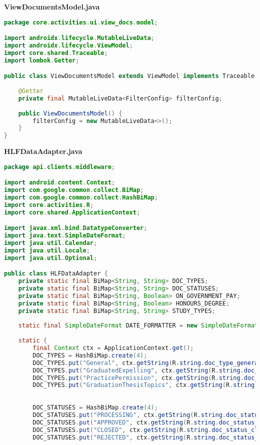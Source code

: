 \textbf{ViewDocumentsModel.java}
\begin{lstlisting}[language=Java]
package core.activities.ui.view_docs.model;

import androidx.lifecycle.MutableLiveData;
import androidx.lifecycle.ViewModel;
import core.shared.Traceable;
import lombok.Getter;

public class ViewDocumentsModel extends ViewModel implements Traceable {
	
	@Getter
	private final MutableLiveData<FilterConfig> filterConfig;
	
	public ViewDocumentsModel() {
		filterConfig = new MutableLiveData<>();
	}
}

\end{lstlisting}
\textbf{HLFDataAdapter.java}
\begin{lstlisting}[language=Java]
package api.clients.middleware;

import android.content.Context;
import com.google.common.collect.BiMap;
import com.google.common.collect.HashBiMap;
import core.activities.R;
import core.shared.ApplicationContext;

import javax.xml.bind.DatatypeConverter;
import java.text.SimpleDateFormat;
import java.util.Calendar;
import java.util.Locale;
import java.util.Optional;

public class HLFDataAdapter {
	private static final BiMap<String, String> DOC_TYPES;
	private static final BiMap<String, String> DOC_STATUSES;
	private static final BiMap<String, Boolean> ON_GOVERNMENT_PAY;
	private static final BiMap<String, Boolean> HONOURS_DEGREE;
	private static final BiMap<String, String> STUDY_TYPES;
	
	static final SimpleDateFormat DATE_FORMATTER = new SimpleDateFormat("dd.MM.yyyy", Locale.ENGLISH);
	
	static {
		final Context ctx = ApplicationContext.get();
		DOC_TYPES = HashBiMap.create(4);
		DOC_TYPES.put("General", ctx.getString(R.string.doc_type_general));
		DOC_TYPES.put("GraduatedExpelling", ctx.getString(R.string.doc_type_graduated_expelling));
		DOC_TYPES.put("PracticePermission", ctx.getString(R.string.doc_type_practice_permission));
		DOC_TYPES.put("GraduationThesisTopics", ctx.getString(R.string.doc_type_graduation_thesis_topics));
		
		
		DOC_STATUSES = HashBiMap.create(4);
		DOC_STATUSES.put("PROCESSING", ctx.getString(R.string.doc_status_processing));
		DOC_STATUSES.put("APPROVED", ctx.getString(R.string.doc_status_approved));
		DOC_STATUSES.put("CLOSED", ctx.getString(R.string.doc_status_closed));
		DOC_STATUSES.put("REJECTED", ctx.getString(R.string.doc_status_rejected));
		

\end{lstlisting}
